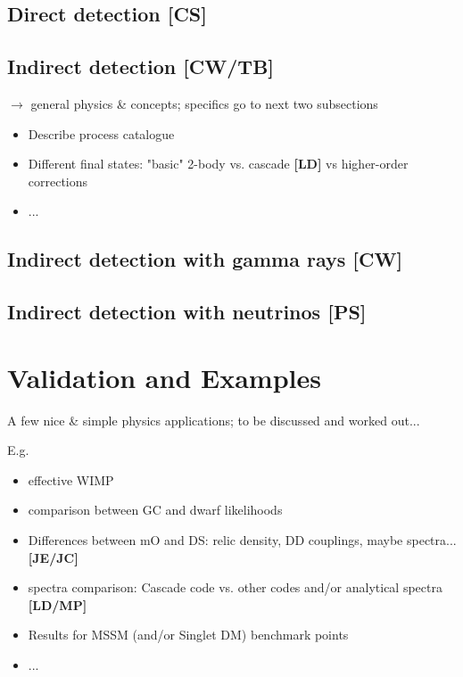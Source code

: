 \subsection{Direct detection {\bf [CS]}}
\label{code_dd}




\subsection{Indirect detection {\bf [CW/TB]}}
\label{code_id}

$\to$ general physics \& concepts; specifics go to next two subsections
\begin{itemize}
\item Describe process catalogue 
\item Different final states: "basic" 2-body vs. cascade {\bf [LD]} vs higher-order corrections
\item...
\end{itemize}

\subsection{Indirect detection with gamma rays {\bf [CW]}}
\label{code_ga}

\subsection{Indirect detection with neutrinos {\bf [PS]}}
\label{code_nu}



\section{Validation and  Examples}
\label{examples}

A few nice \& simple physics applications; to be discussed and worked out...

E.g.
\begin{itemize}
\item effective WIMP
\item comparison between GC and dwarf likelihoods
\item Differences between mO and DS: relic density, DD couplings, maybe spectra... {\bf [JE/JC]}
\item spectra comparison: Cascade code vs. other codes and/or analytical spectra {\bf [LD/MP]}
\item Results for MSSM (and/or Singlet DM) benchmark points
\item  ...
\end{itemize}

